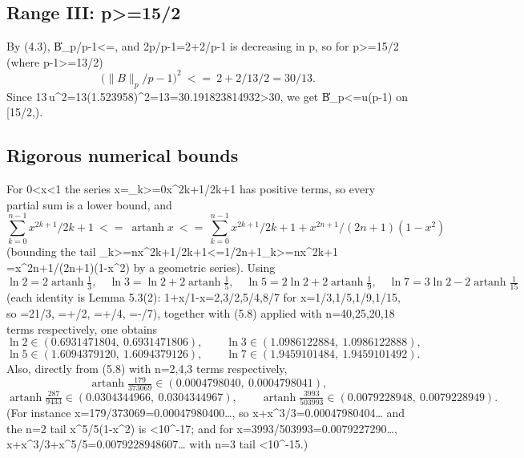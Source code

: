 \documentclass[10pt,reqno]{amsart}
\def\({}\def\){}%
\def\frac#1#2{#1/#2}%
\def\ge{>=}\def\le{<=}%
\theoremstyle{definition}
\theoremstyle{remark}
\begin{document}
\subsection{Range III: \(p\ge\frac{15}{2}\)}\label{subsec:range3}

By (4.3), \(\frac{\|B\|_p}{p-1}\le\sqrt{\frac{2p}{p-1}}\), and \(\frac{2p}{p-1}=2+\frac2{p-1}\) is decreasing in \(p\), so for \(p\ge\frac{15}2\) (where \(p-1\ge\frac{13}2\)) \[\Big(\frac{\|B\|_p}{p-1}\Big)^2\ \le\ 2+\frac2{13/2}=\frac{30}{13} .\] Since \(13\,u^2=13\cdot(1.523958)^2=13=30.191823814932>30\), we get \(\|B\|_p\le u(p-1)\) on \([\frac{15}2,\infty)\).

\subsection{Rigorous numerical bounds}\label{subsec:numerics}

For \(0<x<1\) the series \(x=\sum_{k\ge0}\frac{x^{2k+1}}{2k+1}\) has positive terms, so every partial sum is a lower bound, and \[\sum_{k=0}^{n-1}\frac{x^{2k+1}}{2k+1}\ \le\ \operatorname{artanh}x\ \le\ \sum_{k=0}^{n-1}\frac{x^{2k+1}}{2k+1}
+\frac{x^{2n+1}}{(2n+1)(1-x^2)} \tag{5.8}\] (bounding the tail \(\sum_{k\ge n}\frac{x^{2k+1}}{2k+1}\le\frac1{2n+1}\sum_{k\ge n}x^{2k+1}
=\frac{x^{2n+1}}{(2n+1)(1-x^2)}\) by a geometric series). Using \[\ln2=2\operatorname{artanh}\tfrac13,\quad
\ln3=\ln2+2\operatorname{artanh}\tfrac15,\quad
\ln5=2\ln2+2\operatorname{artanh}\tfrac19,\quad
\ln7=3\ln2-2\operatorname{artanh}\tfrac1{15}\] (each identity is Lemma 5.3(2): \(\frac{1+x}{1-x}=2,\frac32,\frac54,\frac87\) for \(x=\frac13,\frac15,\frac19,\frac1{15}\), so \(=2\frac13\), \(=+\ln\frac32\), \(=+\ln\frac54\), \(=-\ln\frac87\)), together with (5.8) applied with \(n=40,25,20,18\) terms respectively, one obtains \[\ln2\in(0.6931471804,\ 0.6931471806),\qquad \ln3\in(1.0986122884,\ 1.0986122888),\] \[\ln5\in(1.6094379120,\ 1.6094379126),\qquad \ln7\in(1.9459101484,\ 1.9459101492). \tag{5.9}\] Also, directly from (5.8) with \(n=2,4,3\) terms respectively, \[\operatorname{artanh}\tfrac{179}{373069}\in(0.0004798040,\ 0.0004798041),\] \[\operatorname{artanh}\tfrac{287}{9433}\in(0.0304344966,\ 0.0304344967),\qquad
\operatorname{artanh}\tfrac{3993}{503993}\in(0.0079228948,\ 0.0079228949). \tag{5.10}\] (For instance \(x=\frac{179}{373069}=0.00047980400\ldots\), so \(x+\frac{x^3}3=0.00047980404\ldots\) and the \(n=2\) tail \(\frac{x^5}{5(1-x^2)}\) is \(<10^{-17}\); and for \(x=\frac{3993}{503993}=0.0079227290\ldots\), \(x+\frac{x^3}3+\frac{x^5}5=0.0079228948607\ldots\) with \(n=3\) tail \(<10^{-15}\).)
\end{document}
